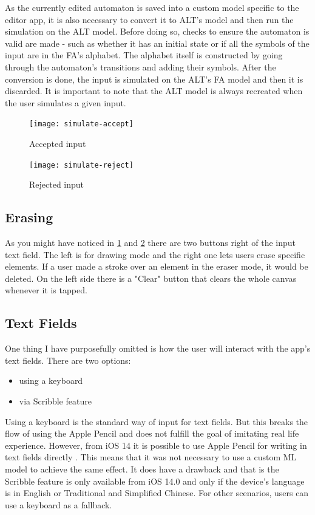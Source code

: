 As the currently edited automaton is saved into a custom model specific to the editor app, it is also necessary to convert it to ALT's model and then run the simulation on the ALT model. Before doing so, checks to ensure the automaton is valid are made - such as whether it has an initial state or if all the symbols of the input are in the FA's alphabet. The alphabet itself is constructed by going through the automaton's transitions and adding their symbols. After the conversion is done, the input is simulated on the ALT's FA model and then it is discarded. It is important to note that the ALT model is always recreated when the user simulates a given input.

\begin{figure}
    \texttt{[image: simulate-accept]}
    \caption{Accepted input}\label{simulate-accept}
\end{figure}

\begin{figure}
    \texttt{[image: simulate-reject]}
    \caption{Rejected input}\label{simulate-reject}
\end{figure}

\subsection{Erasing}

As you might have noticed in \ref{simulate-accept} and \ref{simulate-reject} there are two buttons right of the input text field. The left is for drawing mode and the right one lets users erase specific elements. If a user made a stroke over an element in the eraser mode, it would be deleted. On the left side there is a "Clear" button that clears the whole canvas whenever it is tapped.

\subsection{Text Fields}

One thing I have purposefully omitted is how the user will interact with the app's text fields. There are two options:
\begin{itemize}
    \item using a keyboard
    \item via Scribble feature
\end{itemize}

Using a keyboard is the standard way of input for text fields. But this breaks the flow of using the Apple Pencil and does not fulfill the goal of imitating real life experience. However, from iOS 14 it is possible to use Apple Pencil for writing in text fields directly \cite{scribble}. This means that it was not necessary to use a custom ML model to achieve the same effect. It does have a drawback and that is the Scribble feature is only available from iOS 14.0 and only if the device's language is in English or Traditional and Simplified Chinese. For other scenarios, users can use a keyboard as a fallback.

